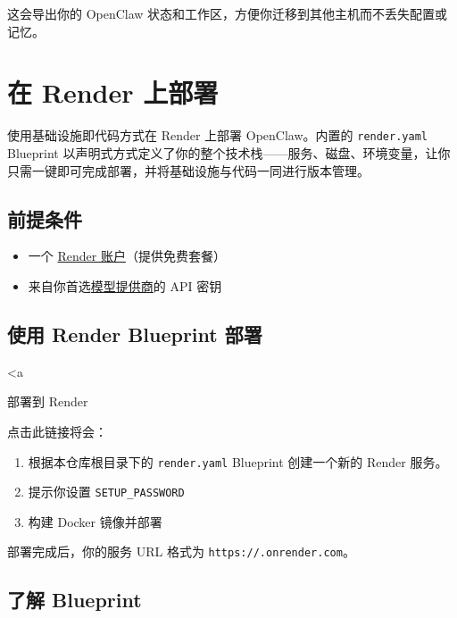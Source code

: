 这会导出你的 OpenClaw 状态和工作区，方便你迁移到其他主机而不丢失配置或记忆。


\clearpage

\section{在 Render 上部署}

使用基础设施即代码方式在 Render 上部署 OpenClaw。内置的 \texttt{render.yaml} Blueprint 以声明式方式定义了你的整个技术栈——服务、磁盘、环境变量，让你只需一键即可完成部署，并将基础设施与代码一同进行版本管理。

\subsection{前提条件}


\begin{itemize}
  \item 一个 \href{https://render.com}{Render 账户}（提供免费套餐）
  \item 来自你首选\href{/providers}{模型提供商}的 API 密钥
\end{itemize}


\subsection{使用 Render Blueprint 部署}


<a
\begin{quote}

\end{quote}

部署到 Render

点击此链接将会：

\begin{enumerate}
  \item 根据本仓库根目录下的 \texttt{render.yaml} Blueprint 创建一个新的 Render 服务。
  \item 提示你设置 \texttt{SETUP\_PASSWORD}
  \item 构建 Docker 镜像并部署
\end{enumerate}


部署完成后，你的服务 URL 格式为 \texttt{https://.onrender.com}。

\subsection{了解 Blueprint}


